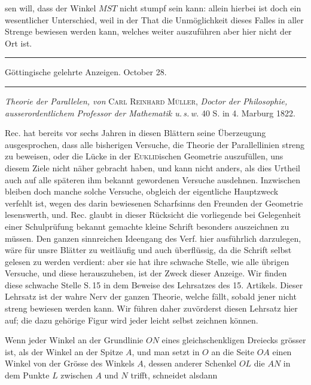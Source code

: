 %
sen will, dass der Winkel \(MST\) nicht stumpf sein kann: allein hierbei ist doch ein wesentlicher Unterschied, weil in der That die Unmöglichkeit dieses Falles in aller Strenge bewiesen werden kann, welches weiter auszuführen aber hier nicht der Ort ist.

\begin{center}
\rule{.85\textwidth}{.3pt}\par
Göttingische gelehrte Anzeigen. October 28.\par
\rule{.85\textwidth}{.3pt}
\end{center}
\hspace*{\parindent}\textit{Theorie der Parallelen, von} \textsc{Carl Reinhard Müller}, \textit{Doctor der Philosophie, ausserordentlichem Professor der Mathematik u.\,s.\,w.} 40 S. in 4. Marburg 1822.

Rec. hat bereits vor sechs Jahren in diesen Blättern seine Überzeugung ausgesprochen, dass alle bisherigen Versuche, die Theorie der Parallellinien streng zu beweisen, oder die Lücke in der \textsc{Euklid}ischen Geometrie auszufüllen, uns diesem Ziele nicht näher gebracht haben, und kann nicht anders, als dies Urtheil auch auf alle späteren ihm bekannt gewordenen Versuche ausdehnen. Inzwischen bleiben doch manche solche Versuche, obgleich der eigentliche Hauptzweck verfehlt ist, wegen des darin bewiesenen Scharfsinns den Freunden der Geometrie lesenswerth, und. Rec. glaubt in dieser Rücksicht die vorliegende bei Gelegenheit einer Schulprüfung bekannt gemachte kleine Schrift besonders auszeichnen zu müssen. Den ganzen sinnreichen Ideengang des Verf. hier ausführlich darzulegen, wäre für unsre Blätter zu weitläufig und auch überflüssig, da die Schrift selbst gelesen zu werden verdient: aber sie hat ihre schwache Stelle, wie alle übrigen Versuche, und diese herauszuheben, ist der Zweck dieser Anzeige. Wir finden diese schwache Stelle S.\,15 in dem Beweise des Lehrsatzes des 15. Artikels. Dieser Lehrsatz ist der wahre Nerv der ganzen Theorie, welche fällt, sobald jener nicht streng bewiesen werden kann. Wir führen daher zuvörderst diesen Lehrsatz hier auf; die dazu gehörige Figur wird jeder leicht selbst zeichnen können.

Wenn jeder Winkel an der Grundlinie \(ON\) eines gleichschenkligen Dreiecks grösser ist, als der Winkel an der Spitze \(A\), und man setzt in \(O\) an die Seite \(OA\) einen Winkel von der Grösse des Winkels \(A\), dessen anderer Schenkel \(OL\) die \(AN\) in dem Punkte \(L\) zwischen \(A\) und \(N\) trifft, schneidet alsdann
